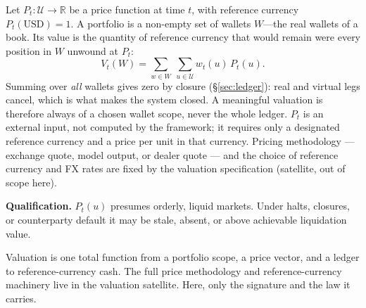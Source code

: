 \begin{definition}
\label{def:portfolio-value}
Let $P_t : \mathcal{U} \to \mathbb{R}$ be a price function at time $t$, with reference currency $P_t(\mathrm{USD}) = 1$. A portfolio is a non-empty set of wallets $W$---the real wallets of a book. Its value is the quantity of reference currency that would remain were every position in $W$ unwound at $P_t$:
\[
V_t(W) = \sum_{w \in W}\ \sum_{u \in \mathcal{U}} w_t(u)\,P_t(u).
\]
Summing over \emph{all} wallets gives zero by closure (\S\ref{sec:ledger}): real and virtual legs cancel, which is what makes the system closed. A meaningful valuation is therefore always of a chosen wallet scope, never the whole ledger. $P_t$ is an external input, not computed by the framework; it requires only a designated reference currency and a price per unit in that currency. Pricing methodology --- exchange quote, model output, or dealer quote --- and the choice of reference currency and FX rates are fixed by the valuation specification (satellite, out of scope here).
\end{definition}

\noindent\textbf{Qualification.} $P_t(u)$ presumes orderly, liquid markets. Under halts, closures, or counterparty default it may be stale, absent, or above achievable liquidation value.

\medskip
\noindent Valuation is one total function from a portfolio scope, a price vector, and a ledger to reference-currency cash. The full price methodology and reference-currency machinery live in the valuation satellite. Here, only the signature and the law it carries.

